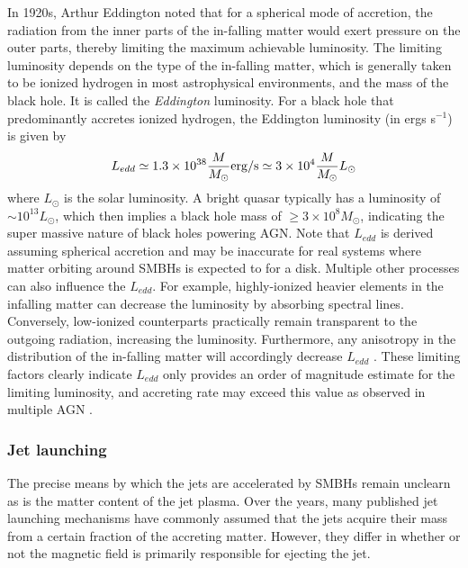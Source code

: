 In 1920s, Arthur Eddington noted that for a spherical mode of accretion, the radiation from the inner parts of the in-falling matter would exert pressure on the outer parts, thereby limiting the maximum achievable luminosity. The limiting luminosity depends on the type of the in-falling matter, which is generally taken to be ionized hydrogen in most astrophysical environments, and the mass of the black hole. It is called the \textit{Eddington} luminosity. For a black hole that predominantly accretes ionized hydrogen, the Eddington luminosity (in ergs s$^{-1}$) is given by
\begin{equation}
    L_{edd}\simeq1.3\times10^{38}\frac{M}{M_\odot}{\rm erg/
    s} 
    \simeq 3\times10^4\frac{M}{M_\odot}L_\odot
\end{equation}
where $L_\odot$ is the solar luminosity. A bright quasar typically has a luminosity of $\sim10^{13}L_\odot$, which then implies a black hole mass of  $\geq3\times10^8M_\odot$, indicating the super massive nature of black holes powering AGN. Note that $L_{edd}$ is derived assuming spherical accretion and may be inaccurate for real systems where matter orbiting around SMBHs is expected to for a disk. Multiple other processes can also influence the $L_{edd}$. For example, highly-ionized heavier elements in the infalling matter can decrease the luminosity by absorbing spectral lines. Conversely, low-ionized counterparts practically remain transparent to the outgoing radiation, increasing the luminosity. Furthermore, any anisotropy in the distribution of the in-falling matter will accordingly decrease $L_{edd}$ \citep{frank2002accretion}. These limiting factors clearly indicate $L_{edd}$ only provides an order of magnitude estimate for the limiting luminosity, and accreting rate may exceed this value as observed in multiple AGN \citep[e.g.,][]{2014ApJ...793..108W,liu2021observational} . 
\subsubsection{Jet launching}
The precise means by which the jets are accelerated by SMBHs remain unclearn as is the matter content of the jet plasma. Over the years, many published jet launching mechanisms have commonly assumed that the jets acquire their mass from a certain fraction of the accreting matter. However, they differ in whether or not the magnetic field is primarily responsible for ejecting the jet.

